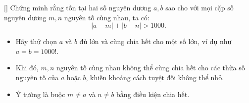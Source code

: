 \documentclass[../01-divisibility.tex]{subfiles}
\begin{document}
\begin{exercise*}\label{example:RUS-2015-TST-D10-P1}[\textbf{}]
    Chứng minh rằng tồn tại hai số nguyên dương \( a, b \) sao cho với mọi cặp số nguyên dương \( m, n \) nguyên tố cùng nhau, ta có:
    \[
        |a - m| + |b - n| > 1000.
    \]
\end{exercise*}

\begin{remark*}
    \begin{itemize}[topsep=0pt, partopsep=0pt, itemsep=0pt]
        \item Hãy thử chọn \( a \) và \( b \) đủ lớn và cùng chia hết cho một số lớn, ví dụ như \( a = b = 1000! \).
        \item Khi đó, \( m, n \) nguyên tố cùng nhau không thể cùng chia hết cho các thừa số nguyên tố của \( a \) hoặc \( b \), khiến khoảng cách tuyệt đối không thể nhỏ.
        \item Ý tưởng là buộc \( m \ne a \) và \( n \ne b \) bằng điều kiện chia hết.
    \end{itemize}
\end{remark*}

\end{document}
